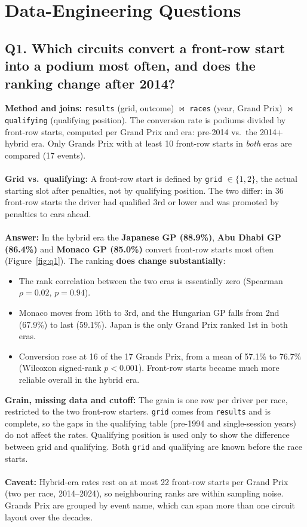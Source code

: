 \documentclass[11pt,a4paper]{article}
\newcommand{\ft}[1]{\texttt{#1}}
\begin{document}
\section{Data-Engineering Questions}

\subsection{Q1. Which circuits convert a front-row start into a podium most often, and does the ranking change after 2014?}
\textbf{Method and joins:} \ft{results} (grid, outcome) $\bowtie$ \ft{races} (year, Grand Prix) $\bowtie$ \ft{qualifying} (qualifying position). The conversion rate is podiums divided by front-row starts, computed per Grand Prix and era: pre-2014 vs.\ the 2014+ hybrid era. Only Grands Prix with at least 10 front-row starts in \emph{both} eras are compared (17 events).
\\
\\
\textbf{Grid vs.\ qualifying:} A front-row start is defined by \ft{grid} $\in\{1,2\}$, the actual starting slot after penalties, not by qualifying position. The two differ: in 36 front-row starts the driver had qualified 3rd or lower and was promoted by penalties to cars ahead.
\\
\\
\textbf{Answer:} In the hybrid era the \textbf{Japanese GP (88.9\%)}, \textbf{Abu Dhabi GP (86.4\%)} and \textbf{Monaco GP (85.0\%)} convert front-row starts most often (Figure~\ref{fig:q1}). The ranking \textbf{does change substantially}:
\begin{itemize}
  \item The rank correlation between the two eras is essentially zero (Spearman $\rho = 0.02$, $p = 0.94$).
  \item Monaco moves from 16th to 3rd, and the Hungarian GP falls from 2nd (67.9\%) to last (59.1\%). Japan is the only Grand Prix ranked 1st in both eras.
  \item Conversion rose at 16 of the 17 Grands Prix, from a mean of 57.1\% to 76.7\% (Wilcoxon signed-rank $p < 0.001$). Front-row starts became much more reliable overall in the hybrid era.
\end{itemize}

\textbf{Grain, missing data and cutoff:} The grain is one row per driver per race, restricted to the two front-row starters. \ft{grid} comes from \ft{results} and is complete, so the gaps in the qualifying table (pre-1994 and single-session years) do not affect the rates. Qualifying position is used only to show the difference between grid and qualifying. Both \ft{grid} and qualifying are known before the race starts.
\\
\\
\textbf{Caveat:} Hybrid-era rates rest on at most 22 front-row starts per Grand Prix (two per race, 2014--2024), so neighbouring ranks are within sampling noise. Grands Prix are grouped by event name, which can span more than one circuit layout over the decades.
\end{document}
